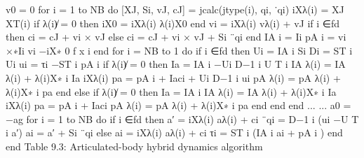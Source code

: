 v0 = 0 for i = 1 to NB do [XJ, Si, vJ, cJ] = jcalc(jtype(i), qi, ˙qi) iXλ(i) = XJ XT(i) if λ(i)̸ = 0 then iX0 = iXλ(i) λ(i)X0 end vi = iXλ(i) vλ(i) + vJ if i ∈fd then ci = cJ + vi × vJ else ci = cJ + vi × vJ + Si ¨qi end IA i = Ii pA i = vi ×∗Ii vi −iX∗ 0 f x i end for i = NB to 1 do if i ∈fd then Ui = IA i Si Di = ST i Ui ui = τi −ST i pA i if λ(i)̸ = 0 then Ia = IA i −Ui D−1 i U T i IA λ(i) = IA λ(i) + λ(i)X∗ i Ia iXλ(i) pa = pA i + Iaci + Ui D−1 i ui pA λ(i) = pA λ(i) + λ(i)X∗ i pa end else if λ(i)̸ = 0 then Ia = IA i IA λ(i) = IA λ(i) + λ(i)X∗ i Ia iXλ(i) pa = pA i + Iaci pA λ(i) = pA λ(i) + λ(i)X∗ i pa end end end ... ... a0 = −ag for i = 1 to NB do if i ∈fd then a′ = iXλ(i) aλ(i) + ci ¨qi = D−1 i (ui −U T i a′) ai = a′ + Si ¨qi else ai = iXλ(i) aλ(i) + ci τi = ST i (IA i ai + pA i ) end end Table 9.3: Articulated-body hybrid dynamics algorithm

